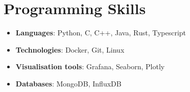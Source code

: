 \documentclass[a4paper,11pt]{article}
\newcommand{\resumeItem}[2]{
  \item\small{
    \textbf{#1}{: #2 \vspace{-2pt}}
  }
}
\newcommand{\resumeSubItem}[2]{\resumeItem{#1}{#2}\vspace{-4pt}}
\newcommand{\resumeSubHeadingListStart}{\begin{itemize}[leftmargin=*]}
\newcommand{\resumeSubHeadingListEnd}{\end{itemize}}
\begin{document}
\section{Programming Skills}
 \resumeSubHeadingListStart
   \resumeSubItem{Languages}
    {Python, C, C++, Java, Rust, Typescript}
    \resumeSubItem{Technologies}
      {Docker, Git, Linux}
    \resumeSubItem{Visualisation tools}
      {Grafana, Seaborn, Plotly}
    \resumeSubItem{Databases}
      {MongoDB, InfluxDB}
 \resumeSubHeadingListEnd


\end{document}
